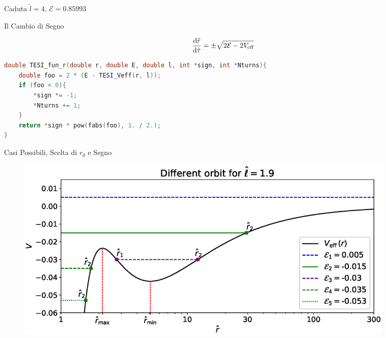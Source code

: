 \begin{frame}{Caduta $\hat l = 4$, $\mathcal E = 0.85993$}
    \centering
\end{frame}


\begin{frame}[t,fragile]{Il Cambio di Segno}

    \begin{equation*}
        \dv{\hat r}{\hat \tau} = \pm \sqrt{2 \mathcal E - 2 V_{\rm eff}}
    \end{equation*}

    \vspace{0.5cm}

\begin{lstlisting}[language=C]
double TESI_fun_r(double r, double E, double l, int *sign, int *Nturns){
    double foo = 2 * (E - TESI_Veff(r, l));
    if (foo < 0){
        *sign *= -1;
        *Nturns += 1;
    }
    return *sign * pow(fabs(foo), 1. / 2.);
}
\end{lstlisting}

\end{frame}


\begin{frame}{Casi Possibili, Scelta di $r_0$ e Segno}

    \begin{figure}
        \centering
        \includegraphics[width=0.9\textwidth]{Figures/ch2/scenario1.eps}
    \end{figure}

\end{frame}


